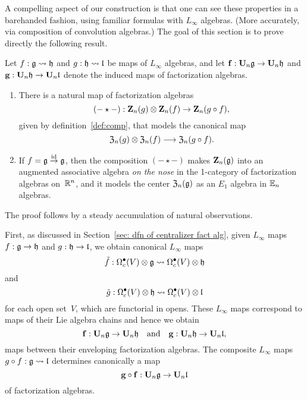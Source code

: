 \documentclass[11pt]{amsart}
\numberwithin{equation}{section}
\begin{document}
A compelling aspect of our construction is that one can see these properties in a barehanded fashion,
using familiar formulas with $L_\infty$ algebras.
(More accurately, via composition of convolution algebras.)
The goal of this section is to prove directly the following result.

\begin{thm}
\label{T:compcentralizer}
Let $f: \mathfrak g \rightsquigarrow \mathfrak h$ and $g: \mathfrak h \rightsquigarrow \mathfrak l$ be maps of  $L_\infty$ algebras,
and let $\bold{f}: \mathbf U_n \mathfrak g \to \mathbf U_n \mathfrak h$ and $\bold{g}: \mathbf U_n \mathfrak h \to \mathbf U_n \mathfrak l$ denote the induced maps of factorization algebras.
\begin{enumerate} 
\item There is a natural map of factorization algebras
\[
(-\star-) : \mathbf Z_n(g) \otimes \mathbf Z_n(f) \to \mathbf Z_n(g \circ f),
\]
given by definition~\ref{def:comp}, 
that models the canonical map 
\[
{\frak Z}_n(g) \otimes {\frak Z}_n(f) \longrightarrow {\frak Z}_n(g\circ f).
\] 
\item If $f= \mathfrak g \stackrel{{\rm id}}\to \mathfrak g$, 
then the composition $(-\star-)$ makes $\mathbf Z_n(\mathfrak g)$ into an 
augmented associative algebra {\em on the nose} in the 1-category of factorization algebras on~$\mathbb R^n$,
and it models the center ${\frak Z}_n(\mathfrak g)$ as an $E_1$ algebra in $\mathbb E_n$ algebras.
\end{enumerate}
\end{thm}

The proof follows by a steady accumulation of natural observations.

First, as discussed in Section~\ref{sec: dfn of centralizer fact alg},
given $L_\infty$ maps $f: \mathfrak g \to \mathfrak h$ and $g: \mathfrak h \to \mathfrak l$,
we obtain canonical $L_\infty$ maps
\[
\tilde{f}: \Omega^\bullet_c(V) \otimes \mathfrak g \rightsquigarrow \Omega^\bullet_c(V) \otimes \mathfrak h
\]
and
\[
\tilde{g}: \Omega^\bullet_c(V) \otimes \mathfrak h \rightsquigarrow \Omega^\bullet_c(V) \otimes \mathfrak l
\]
for each open set~$V$,
which are functorial in opens.
These $L_\infty$ maps correspond to maps of their Lie algebra chains and hence we obtain
\[ 
\mathbf{f}: \mathbf U_n \mathfrak g \to  \mathbf U_n \mathfrak h \quad \text{and} \quad \mathbf{g}: \mathbf U_n \mathfrak h \to  \mathbf U_n \mathfrak l,
\]
maps between their enveloping factorization algebras.
The composite $L_\infty$ maps $g \circ f: \mathfrak g \rightsquigarrow \mathfrak l$ determines canonically a map
\[
\mathbf{g \circ f}: \mathbf U_n \mathfrak g \to \mathbf U_n \mathfrak l
\]
of factorization algebras.
\end{document}
